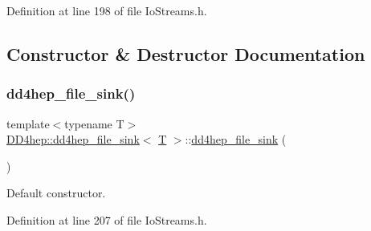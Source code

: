 Definition at line 198 of file Io\+Streams.\+h.



\subsection{Constructor \& Destructor Documentation}
\hypertarget{class_d_d4hep_1_1dd4hep__file__sink_ab8a6a3d1d07d6d0488305e3a961961b2}{}\label{class_d_d4hep_1_1dd4hep__file__sink_ab8a6a3d1d07d6d0488305e3a961961b2} 
\subsubsection{\texorpdfstring{dd4hep\+\_\+file\+\_\+sink()}{dd4hep\_file\_sink()}\hspace{0.1cm}{\footnotesize\ttfamily [1/6]}}
{\footnotesize\ttfamily template$<$typename T$>$ \\
\hyperlink{class_d_d4hep_1_1dd4hep__file__sink}{D\+D4hep\+::dd4hep\+\_\+file\+\_\+sink}$<$ \hyperlink{class_t}{T} $>$\+::\hyperlink{class_d_d4hep_1_1dd4hep__file__sink}{dd4hep\+\_\+file\+\_\+sink} (\begin{DoxyParamCaption}{ }\end{DoxyParamCaption})\hspace{0.3cm}{\ttfamily [inline]}}



Default constructor. 



Definition at line 207 of file Io\+Streams.\+h.

\hypertarget{class_d_d4hep_1_1dd4hep__file__sink_ac0b723f77cc833f04bbf72fc8a5bada7}{}\label{class_d_d4hep_1_1dd4hep__file__sink_ac0b723f77cc833f04bbf72fc8a5bada7} 

